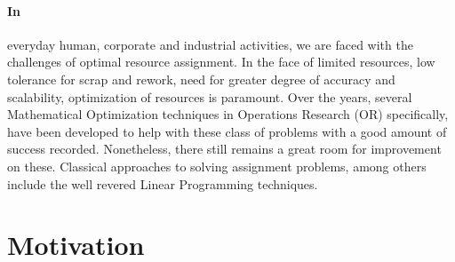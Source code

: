 \documentclass[a4paper,openany]{book}
\begin{document}
        \paragraph{In}
			everyday human, corporate and industrial activities, we are faced with the challenges of optimal resource assignment. In the face of limited resources, low tolerance for scrap and rework, need for greater degree of accuracy and scalability, optimization of resources is paramount.
            Over the years, several Mathematical Optimization techniques in Operations Research (OR) specifically, have been developed to help with these class of problems with a good amount of success recorded. Nonetheless, there still remains a great room for improvement on these. Classical approaches to solving assignment problems, among others include the well revered Linear Programming techniques.
		\section{Motivation}
\end{document}

